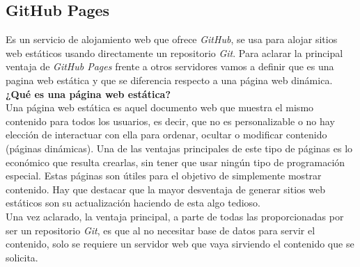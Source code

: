 \subsection*{GitHub Pages}
\label{subsec:githubpages}
Es un servicio de alojamiento web que ofrece \emph{GitHub}, se usa para alojar sitios web estáticos usando directamente un repositorio \emph{Git}. Para aclarar la principal ventaja de \emph{GitHub Pages} frente a otros servidores vamos a definir que es una pagina web estática y que se diferencia respecto a una página web dinámica. \\
\textbf{¿Qué es una página web estática?}\\
Una página web estática es aquel documento web que muestra el mismo contenido para todos los usuarios, es decir, que no es personalizable o no hay elección de interactuar con ella para ordenar, ocultar o modificar contenido (páginas dinámicas). Una de las ventajas principales de este tipo de páginas es lo económico que resulta crearlas, sin tener que usar ningún tipo de programación especial. Estas páginas son útiles para el objetivo de simplemente mostrar contenido. Hay que destacar que la mayor desventaja de generar sitios web estáticos son su actualización haciendo de esta algo tedioso. \\
Una vez aclarado, la ventaja principal, a parte de todas las proporcionadas por ser un repositorio \emph{Git}, es que al no necesitar base de datos para servir el contenido, solo se requiere un servidor web que vaya sirviendo el contenido que se solicita.


